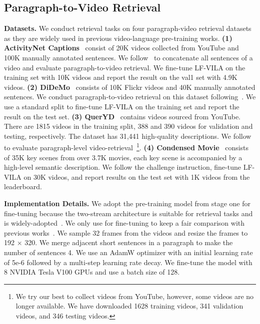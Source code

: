 \documentclass{article}
\begin{document}
\subsection{Paragraph-to-Video Retrieval}
\textbf{Datasets.}
We conduct retrieval tasks on four paragraph-video retrieval datasets as they are widely used in previous video-language pre-training works.
\textbf{(1) ActivityNet Captions}~\cite{krishna2017actnetcaption} consist of 20K videos collected from YouTube and 100K manually annotated sentences. We follow~\cite{lei2021clipbert,xue2021hdvila,zhang2018hse} to concatenate all sentences of a video and evaluate paragraph-to-video retrieval. We fine-tune LF-VILA on the training set with 10K videos and report the result on the val1 set with 4.9K videos.
\textbf{(2) DiDeMo}~\cite{anne2017didemo} consists of 10K Flickr videos and 40K manually annotated sentences. We conduct paragraph-to-video retrieval on this dataset following~\cite{bain2021frozen,lei2021clipbert,xue2021hdvila}. We use a standard split to fine-tune LF-VILA on the training set and report the result on the test set.
\textbf{(3) QuerYD}~\cite{oncescu2021queryd} contains videos sourced from YouTube. There are 1815 videos in the training split, 388 and 390 videos for validation and testing, respectively. The dataset has 31,441 high-quality descriptions. We follow~\cite{croitoru2021teachtext,oncescu2021queryd} to evaluate paragraph-level video-retrieval~\footnote{We try our best to collect videos from YouTube, however, some videos are no longer available. We have downloaded 1628 training videos, 341 validation videos, and 346 testing videos.}.
\textbf{(4) Condensed Movie}~\cite{bain2020cmovie} consists of 35K key scenes from over 3.7K movies, each key scene is accompanied by a high-level semantic description. We follow the challenge instruction, fine-tune LF-VILA on 30K videos, and report results on the test set with 1K videos from the leaderboard.

\textbf{Implementation Details.}
We adopt the pre-training model from stage one for fine-tuning because the two-stream architecture is suitable for retrieval tasks and is widely-adopted~\cite{bain2021frozen,xue2021hdvila}. We only use  for fine-tuning to keep a fair comparison with previous works~\cite{bain2021frozen,xue2021hdvila}. We sample 32 frames from the videos and resize the frames to 192 × 320. We merge adjacent short sentences in a paragraph to make the number of sentences 4. We use an AdamW optimizer with an initial learning rate of 5e-6 followed by a multi-step learning rate decay. We fine-tune the model with 8 NVIDIA Tesla V100 GPUs and use a batch size of 128. 
\end{document}
